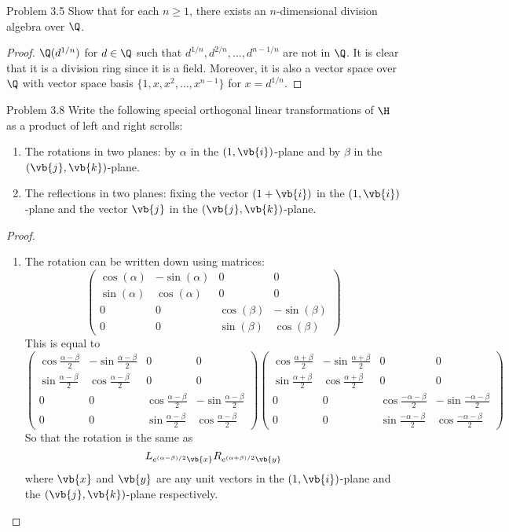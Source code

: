 \documentclass[a4paper]{article}
\begin{document}
\begin{ex}{Problem 3.5}{} Show that for each $n\geq 1$, there exists an $n$-dimensional division algebra over $\Q$. \tcbline
\begin{proof}
$\Q(d^{1/n})$ for $d\in\Q$ such that $d^{1/n},d^{2/n},\dots,d^{n-1/n}$ are not in $\Q$. It is clear that it is a division ring since it is a field. Moreover, it is also a vector space over $\Q$ with vector space basis $\{1,x,x^2,\dots,x^{n-1}\}$ for $x=d^{1/n}$. 
\end{proof}
\end{ex}

\begin{ex}{Problem 3.8}{} Write the following special orthogonal linear transformations of $\H$ as a product of left and right scrolls: 
\begin{enumerate}
\item The rotations in two planes: by $\alpha$ in the $(1,\vb{i})$-plane and by $\beta$ in the $(\vb{j},\vb{k})$-plane. 
\item The reflections in two planes: fixing the vector $(1+\vb{i})$ in the $(1,\vb{i})$-plane and the vector $\vb{j}$ in the $(\vb{j},\vb{k})$-plane. 
\end{enumerate} \tcbline
\begin{proof}~\\
\begin{enumerate}
\item The rotation can be written down using matrices: $$\begin{pmatrix}
\cos(\alpha) & -\sin(\alpha) & 0 & 0\\
\sin(\alpha) & \cos(\alpha) & 0 & 0\\
0 & 0 & \cos(\beta) & -\sin(\beta)\\
0 & 0 & \sin(\beta) & \cos(\beta)
\end{pmatrix}$$ This is equal to $$\begin{pmatrix}
\cos\frac{\alpha-\beta}{2} & -\sin\frac{\alpha-\beta}{2} & 0 & 0 \\
\sin\frac{\alpha-\beta}{2} & \cos\frac{\alpha-\beta}{2} & 0 & 0 \\
0 & 0 & \cos\frac{\alpha-\beta}{2} & -\sin\frac{\alpha-\beta}{2}\\
0 & 0 & \sin\frac{\alpha-\beta}{2} & \cos\frac{\alpha-\beta}{2}
\end{pmatrix}\begin{pmatrix}
\cos\frac{\alpha+\beta}{2} & -\sin\frac{\alpha+\beta}{2} & 0 & 0 \\
\sin\frac{\alpha+\beta}{2} & \cos\frac{\alpha+\beta}{2} & 0 & 0 \\
0 & 0 & \cos\frac{-\alpha-\beta}{2} & -\sin\frac{-\alpha-\beta}{2}\\
0 & 0 & \sin\frac{-\alpha-\beta}{2} & \cos\frac{-\alpha-\beta}{2}
\end{pmatrix}$$
So that the rotation is the same as $$L_{e^{(\alpha-\beta)/2}\vb{x}}R_{e^{(\alpha+\beta)/2}\vb{y}}$$ where $\vb{x}$ and $\vb{y}$ are any unit vectors in the $(1,\vb{i})$-plane and the $(\vb{j},\vb{k})$-plane respectively. 


\end{enumerate}
\end{proof}
\end{ex}
\end{document}
